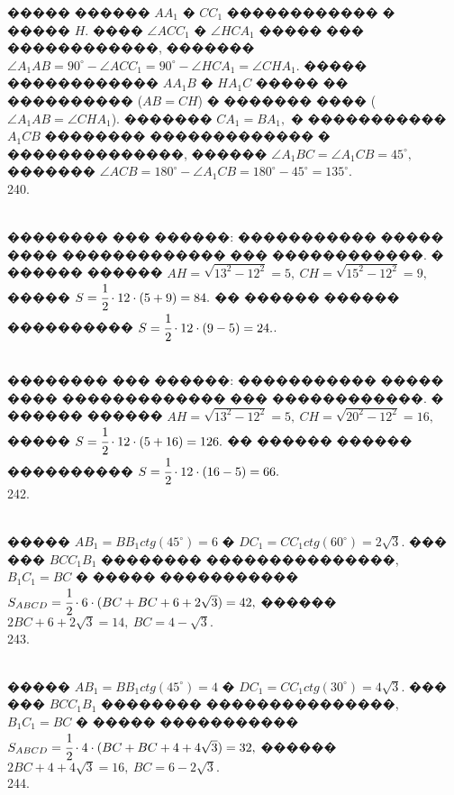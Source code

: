 \documentclass[12pt]{article}
\begin{document}
����� ������ $AA_1$ � $CC_1$ ������������ � ����� $H.$ ���� $\angle ACC_1$ � $\angle HCA_1$ ����� ��� ������������, ������� $\angle A_1AB=90^\circ-\angle ACC_1=90^\circ-\angle HCA_1=\angle CHA_1.$ ����� ������������ $AA_1B$ � $HA_1C$ ����� �� ���������� ($AB=CH$) � ������� ���� ($\angle A_1AB=\angle CHA_1$). ������� $CA_1=BA_1,$ � ����������� $A_1CB$ �������� ������������� � ��������������, ������ $\angle A_1BC=\angle A_1CB=45^\circ,$ ������� $\angle ACB=180^\circ-\angle A_1CB=180^\circ-45^\circ=135^\circ.$\\
240. \begin{figure}[ht!]
\end{figure}\\
�������� ��� ������: ����������� ����� ���� ������������� ��� ������������. � ������ ������ $AH=\sqrt{13^2-12^2}=5,\ CH=\sqrt{15^2-12^2}=9,$ ����� $S=\cfrac{1}{2}\cdot12\cdot(5+9)=84.$ �� ������ ������ ���������� $S=\cfrac{1}{2}\cdot12\cdot(9-5)=24.$\newpage{}. \begin{figure}[ht!]
\end{figure}\\
�������� ��� ������: ����������� ����� ���� ������������� ��� ������������. � ������ ������ $AH=\sqrt{13^2-12^2}=5,\ CH=\sqrt{20^2-12^2}=16,$ ����� $S=\cfrac{1}{2}\cdot12\cdot(5+16)=126.$ �� ������ ������ ���������� $S=\cfrac{1}{2}\cdot12\cdot(16-5)=66.$\\
242. \begin{figure}[ht!]
\end{figure}\\
����� $AB_1=BB_1 ctg(45^\circ)=6$ � $DC_1=CC_1 ctg(60^\circ)=2\sqrt{3}.$ ��� ��� $BCC_1B_1$ �������� ���������������, $B_1C_1=BC$ � ����� �����������
$S_{ABCD}=\cfrac{1}{2}\cdot6\cdot(BC+BC+6+2\sqrt{3})=42,$ ������ $2BC+6+2\sqrt{3}=14,\ BC=4-\sqrt{3}.$\\
243. \begin{figure}[ht!]
\end{figure}\\
����� $AB_1=BB_1 ctg(45^\circ)=4$ � $DC_1=CC_1 ctg(30^\circ)=4\sqrt{3}.$ ��� ��� $BCC_1B_1$ �������� ���������������, $B_1C_1=BC$ � ����� �����������
$S_{ABCD}=\cfrac{1}{2}\cdot4\cdot(BC+BC+4+4\sqrt{3})=32,$ ������ $2BC+4+4\sqrt{3}=16,\ BC=6-2\sqrt{3}.$\\
244. \begin{figure}[ht!]
\end{figure}\\
\end{document}
